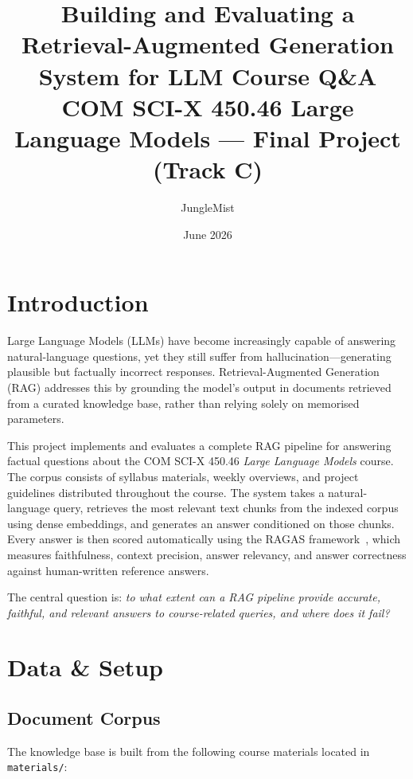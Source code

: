 \documentclass[11pt,a4paper]{article}
\title{\textbf{Building and Evaluating a Retrieval-Augmented Generation\\
System for LLM Course Q\&A}\\[0.5em]
\large COM SCI-X 450.46 Large Language Models --- Final Project (Track C)}
\author{JungleMist}
\date{June 2026}
\begin{document}
\maketitle

\section{Introduction}

Large Language Models (LLMs) have become increasingly capable of answering
natural-language questions, yet they still suffer from hallucination---generating
plausible but factually incorrect responses.  Retrieval-Augmented Generation
(RAG) addresses this by grounding the model's output in documents retrieved from
a curated knowledge base, rather than relying solely on memorised parameters.

This project implements and evaluates a complete RAG pipeline for answering
factual questions about the COM SCI-X 450.46 \emph{Large Language Models} course.
The corpus consists of syllabus materials, weekly overviews, and project
guidelines distributed throughout the course.  The system takes a natural-language
query, retrieves the most relevant text chunks from the indexed corpus using dense
embeddings, and generates an answer conditioned on those chunks.  Every answer is
then scored automatically using the RAGAS framework~\cite{ragas}, which measures
faithfulness, context precision, answer relevancy, and answer correctness against
human-written reference answers.

The central question is: \emph{to what extent can a RAG pipeline provide accurate,
faithful, and relevant answers to course-related queries, and where does it fail?}

\section{Data \& Setup}

\subsection{Document Corpus}

The knowledge base is built from the following course materials located in
\texttt{materials/}:
\end{document}
